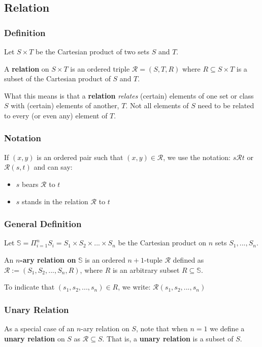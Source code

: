 \subsection{Relation}
\subsubsection{Definition}
Let $S \times T$ be the Cartesian product of two sets $S$ and $T$.

A \textbf{relation} on $S \times T$ is an ordered triple
$ \mathcal{R} = (S, T, R) $ where $R \subseteq S \times T$ is a
subset of the Cartesian product of $S$ and $T$.

What this means is that a \textbf{relation} \textit{relates} (certain)
elements of one set or class $S$ with (certain) elements of another,
$T$. Not all elements of $S$ need to be related to every (or even any)
element of $T$.

\subsubsection{Notation}

If $(x, y)$ is an ordered pair such that $(x, y) \in \mathcal{R}$, we
use the notation: $ s \mathcal{R} t$ or $ \mathcal{R}(s, t)$ and can
say:
\begin{itemize}
\item $s$ bears $\mathcal{R}$ to $t$
\item $s$ stands in the relation $\mathcal{R}$ to $t$
\end{itemize}

\subsubsection{General Definition}
Let
$\mathbb{S} = \Pi^n_{i=1}S_i = S_1 \times S_2 \times ... \times S_n $
be the Cartesian product on $n$ sets $S_1, ..., S_n$.

An \textbf{$n$-ary relation on} $\mathbb{S}$ is an ordered
$n+1$-tuple $\mathcal{R}$ defined as
$\mathcal{R} := (S_1, S_2, ..., S_n, R)$, where $R$ is an arbitrary
subset $R \subseteq \mathbb{S}$.

To indicate that $(s_1, s_2, ..., s_n) \in R$, we
write: $\mathcal{R}(s_1, s_2, ..., s_n)$

\subsubsection{Unary Relation}
As a special case of an $n$-ary relation on $S$, note that when $n=1$
we define a \textbf{unary relation} on $S$ as
$\mathcal{R} \subseteq S$. That is, a \textbf{unary relation} is a
subset of $S$.

